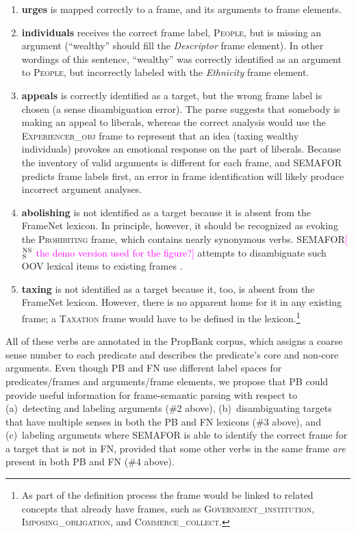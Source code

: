 \documentclass[11pt]{article}
\newcommand{\ensuretext}[1]{#1}
\newcommand{\nssmarker}{\ensuretext{\textcolor{magenta}{\ensuremath{^{\textsc{NS}}_{\textsc{S}}}}}}
\newcommand{\arkcomment}[3]{\ensuretext{\textcolor{#3}{[#1 #2]}}}
\newcommand{\nss}[1]{\arkcomment{\nssmarker}{#1}{magenta}}
\newcommand{\vpred}[1]{\textbf{#1}} %
\newcommand{\fname}[1]{\textsc{#1}} %
\newcommand{\rname}[1]{\textsl{#1}} %
\begin{document}
\begin{enumerate}
  \item \vpred{urges} is mapped correctly to a frame, and its arguments to frame elements.
  \item \vpred{individuals} receives the correct frame label, \fname{People}, but is missing an argument 
  (``wealthy'' should fill the \rname{Descriptor} frame element). In other wordings of this sentence, 
  ``wealthy'' was correctly identified as an argument to \fname{People}, but incorrectly labeled 
  with the \rname{Ethnicity} frame element. 
  \item \vpred{appeals} is correctly identified as a target, but the wrong frame label is chosen 
  (a sense disambiguation error). The parse suggests that somebody is making an appeal to liberals, 
  whereas the correct analysis would use the \fname{Experiencer\_obj} frame to represent that an idea
  (taxing wealthy individuals) provokes an emotional response on the part of liberals. 
  Because the inventory of valid arguments is different for each frame, and SEMAFOR predicts frame labels first, 
  an error in frame identification will likely produce incorrect argument analyses.
  \item \vpred{abolishing} is not identified as a target because it is absent from the FrameNet lexicon. 
  In principle, however, it should be recognized as evoking the \fname{Prohibiting} frame, which contains 
  nearly synonymous verbs. SEMAFOR\nss{the demo version used for the figure?} attempts to disambiguate such OOV lexical items 
  to existing frames \citep{das-acl2011}.
  \item \vpred{taxing} is not identified as a target because it, too, is absent from the FrameNet lexicon. 
  However, there is no apparent home for it in any existing frame; a \fname{Taxation} frame would have to be defined 
  in the lexicon.\footnote{As part of the definition process the frame would be linked to related concepts that already have frames, 
  such as \fname{Government\_institution}, \fname{Imposing\_obligation}, and \fname{Commerce\_collect}.}
\end{enumerate}

All of these verbs are annotated in the PropBank corpus, which assigns a coarse sense number 
to each predicate and describes the predicate's core and non-core arguments. 
Even though PB and FN use different label spaces for predicates/frames and 
arguments/frame elements, we propose that PB could provide useful information for frame-semantic parsing 
with respect to (a)~detecting and labeling arguments (\#2 above),  
(b)~disambiguating targets that have multiple senses in both the PB and FN lexicons (\#3 above), and
(c)~labeling arguments where SEMAFOR is able to identify the correct frame for a target that is not in FN, 
provided that some other verbs in the same frame \emph{are} present in both PB and FN (\#4 above).
\end{document}
